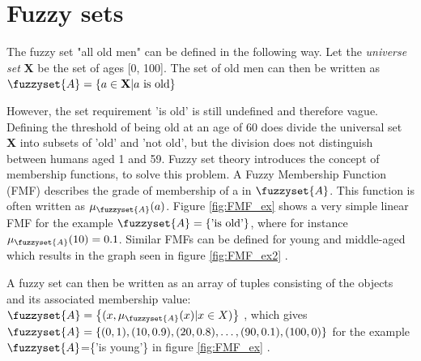 \section{Fuzzy sets}
The fuzzy set "all old men" can be defined in the following way. Let the \textit{universe set} \textbf{X} be the set of ages [0, 100]. The set of old men can then be written as
$\fuzzyset{A}=\left \{ a \in \textbf{X} | a \text{ is old} \right \}$
\cite{chen2000introduction}

However, the set requirement 'is old' is still undefined and therefore vague. Defining the threshold of being old at an age of 60 does divide the universal set \textbf{X} into subsets of 'old' and 'not old', but the division does not distinguish between humans aged 1 and 59.
Fuzzy set theory introduces the concept of membership functions, to solve this problem. A Fuzzy Membership Function (FMF) describes the grade of membership of a  in  $\fuzzyset{A}$. This function is often written as $\mu_{\fuzzyset{A}}(a)$. Figure \ref{fig:FMF_ex} shows a very simple linear FMF for the example $\fuzzyset{A}=\left \{\text{'is old'} \right \}$, where for instance $\mu_{\fuzzyset{A}}(10)=0.1$. Similar FMFs can be defined for young and middle-aged which results in the graph seen in figure \ref{fig:FMF_ex2} \cite{ross2009fuzzy}.

A fuzzy set can then be written as an array of tuples consisting of the objects and its associated membership value: $\fuzzyset{A}=\left \{(x,\mu_{\fuzzyset{A}}(x)|x \in X) \right \}$ \cite{zimmermann2010fuzzy}, which gives \\ $\fuzzyset{A}=\left \{(0,1),(10,0.9),(20,0.8),\dots,(90,0.1),(100,0) \right \}$ for the example $\fuzzyset{A}$=\{'is young'\} in figure \ref{fig:FMF_ex} \cite{ross2009fuzzy}.

